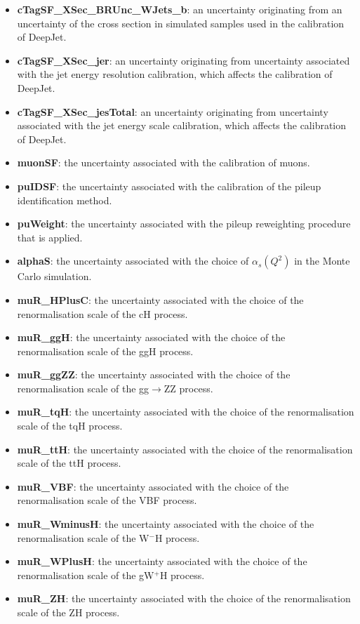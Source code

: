 \begin{itemize}
    \item \textbf{cTagSF\_XSec\_BRUnc\_WJets\_b}: an uncertainty originating from an uncertainty of the cross section in simulated samples used in the calibration of \textsf{DeepJet}.
    \item \textbf{cTagSF\_XSec\_jer}: an uncertainty originating from uncertainty associated with the jet energy resolution calibration, which affects the calibration of \textsf{DeepJet}.
    \item \textbf{cTagSF\_XSec\_jesTotal}: an uncertainty originating from uncertainty associated with the jet energy scale calibration, which affects the calibration of \textsf{DeepJet}.
    \item \textbf{muonSF}: the uncertainty associated with the calibration of muons.
    \item \textbf{puIDSF}: the uncertainty associated with the calibration of the pileup identification method.
    \item \textbf{puWeight}: the uncertainty associated with the pileup reweighting procedure that is applied. 
    \item \textbf{alphaS}: the uncertainty associated with the choice of $\alpha_s(Q^2)$ in the Monte Carlo simulation. 
    \item \textbf{muR\_HPlusC}: the uncertainty associated with the choice of the renormalisation scale of the cH process.
    \item \textbf{muR\_ggH}: the uncertainty associated with the choice of the renormalisation scale of the ggH process.
    \item \textbf{muR\_ggZZ}: the uncertainty associated with the choice of the renormalisation scale of the gg$\rightarrow$ZZ process.
    \item \textbf{muR\_tqH}: the uncertainty associated with the choice of the renormalisation scale of the tqH process.
    \item \textbf{muR\_ttH}: the uncertainty associated with the choice of the renormalisation scale of the ttH process.
    \item \textbf{muR\_VBF}: the uncertainty associated with the choice of the renormalisation scale of the VBF process.
    \item \textbf{muR\_WminusH}: the uncertainty associated with the choice of the renormalisation scale of the W$^{-}$H process.
    \item \textbf{muR\_WPlusH}: the uncertainty associated with the choice of the renormalisation scale of the gW$^{+}$H process.
    \item \textbf{muR\_ZH}: the uncertainty associated with the choice of the renormalisation scale of the ZH process.

\end{itemize}
